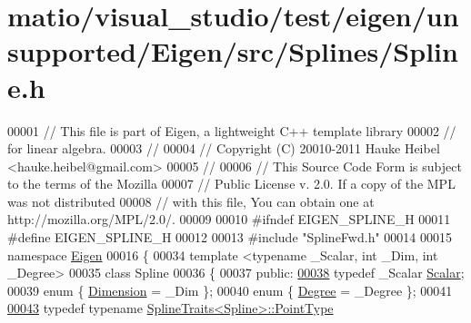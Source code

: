 \hypertarget{matio_2visual__studio_2test_2eigen_2unsupported_2_eigen_2src_2_splines_2_spline_8h_source}{}\section{matio/visual\+\_\+studio/test/eigen/unsupported/\+Eigen/src/\+Splines/\+Spline.h}
\label{matio_2visual__studio_2test_2eigen_2unsupported_2_eigen_2src_2_splines_2_spline_8h_source}

\begin{DoxyCode}
00001 \textcolor{comment}{// This file is part of Eigen, a lightweight C++ template library}
00002 \textcolor{comment}{// for linear algebra.}
00003 \textcolor{comment}{//}
00004 \textcolor{comment}{// Copyright (C) 20010-2011 Hauke Heibel <hauke.heibel@gmail.com>}
00005 \textcolor{comment}{//}
00006 \textcolor{comment}{// This Source Code Form is subject to the terms of the Mozilla}
00007 \textcolor{comment}{// Public License v. 2.0. If a copy of the MPL was not distributed}
00008 \textcolor{comment}{// with this file, You can obtain one at http://mozilla.org/MPL/2.0/.}
00009 
00010 \textcolor{preprocessor}{#ifndef EIGEN\_SPLINE\_H}
00011 \textcolor{preprocessor}{#define EIGEN\_SPLINE\_H}
00012 
00013 \textcolor{preprocessor}{#include "SplineFwd.h"}
00014 
00015 \textcolor{keyword}{namespace }\hyperlink{namespace_eigen}{Eigen}
00016 \{
00034   \textcolor{keyword}{template} <\textcolor{keyword}{typename} \_Scalar, \textcolor{keywordtype}{int} \_Dim, \textcolor{keywordtype}{int} \_Degree>
00035   \textcolor{keyword}{class }Spline
00036   \{
00037   \textcolor{keyword}{public}:
\hyperlink{group___splines___module_a8cafd78b564825c76fbb3419653d9742}{00038}     \textcolor{keyword}{typedef} \_Scalar \hyperlink{group___splines___module_a8cafd78b564825c76fbb3419653d9742}{Scalar}; 
00039     \textcolor{keyword}{enum} \{ \hyperlink{group___splines___module_a82c233f1d4719bc52397d64a6c96c5b0a25366e5e79da5355d259a71096d8d8a7}{Dimension} = \_Dim  \};
00040     \textcolor{keyword}{enum} \{ \hyperlink{group___splines___module_a40cd07294408f87d39763e15b331b4d1a7bc38582fb1bae7db67c89b6c5f45f24}{Degree} = \_Degree  \};
00041 
\hyperlink{group___splines___module_a9ade8a2f81dae6eedb8845cb080672bd}{00043}     \textcolor{keyword}{typedef} \textcolor{keyword}{typename} \hyperlink{struct_eigen_1_1_spline_traits}{SplineTraits<Spline>::PointType} 

\end{DoxyCode}
